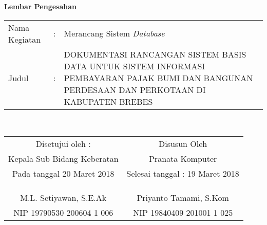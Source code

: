 \begin{center}
{\huge \bfseries Lembar Pengesahan}\\[0.4cm]

\begin{tabular}{l c p{10cm}}
  Nama Kegiatan & : & Merancang Sistem \textit{Database} \\
  Judul & : & DOKUMENTASI RANCANGAN SISTEM BASIS DATA UNTUK SISTEM INFORMASI PEMBAYARAN PAJAK BUMI DAN BANGUNAN PERDESAAN DAN PERKOTAAN DI KABUPATEN BREBES \\
\end{tabular}\\[2cm]

\begin{tabular}{c c}
  Disetujui oleh : & Disusun Oleh \\
  Kepala Sub Bidang Keberatan & Pranata Komputer \\
  Pada tanggal 20 Maret 2018 & Selesai tanggal : 19 Maret 2018 \\
  & \\
  & \\
  & \\
  M.L. Setiyawan, S.E.Ak & Priyanto Tamami, S.Kom \\
  NIP 19790530 200604 1 006 & NIP 19840409 201001 1 025
\end{tabular}

\end{center}